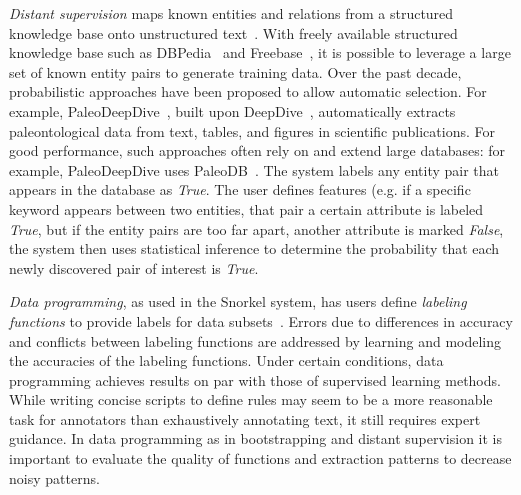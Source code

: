 \textit{Distant supervision} maps known entities and relations from a structured knowledge 
base onto unstructured text~\cite{peters2014machine,de2016deepdive}. 
With freely available structured knowledge base such as DBPedia~\cite{auer2007dbpedia} and Freebase~\cite{bollacker2008freebase}, it is possible to leverage a large set of known entity pairs to generate training data.
Over the past decade, probabilistic approaches have been proposed to allow automatic selection.
For example, PaleoDeepDive~\cite{peters2014machine}, built upon DeepDive~\cite{de2016deepdive}, automatically extracts
paleontological data from text, tables, and figures in scientific publications. 
For good performance, such approaches often rely on and extend large databases: for example,
PaleoDeepDive uses PaleoDB~\cite{PaleoDB}. 
The system labels any entity pair that appears in the database as \textit{True}.
The user defines features (e.g. if a specific keyword appears between two entities, that pair a certain attribute is labeled \textit{True}, but if the entity pairs are too far apart, another attribute is marked \textit{False}, 
the system then uses statistical inference to determine the probability that each newly discovered pair of interest is \textit{True}.

\textit{Data programming}, as used in the Snorkel system, has users define 
\textit{labeling functions} to provide labels for data subsets~\cite{ratner2016data}. 
Errors due to differences in accuracy and conflicts between labeling functions are 
addressed by learning and modeling the accuracies of the labeling functions. 
Under certain conditions, data programming achieves results on par with those of supervised learning methods.
While writing concise scripts to define rules may seem to be a more reasonable task for annotators 
than exhaustively annotating text, it still requires expert guidance.  
In data programming as in bootstrapping and distant supervision it is important to evaluate the quality of functions and extraction patterns to decrease noisy patterns.

